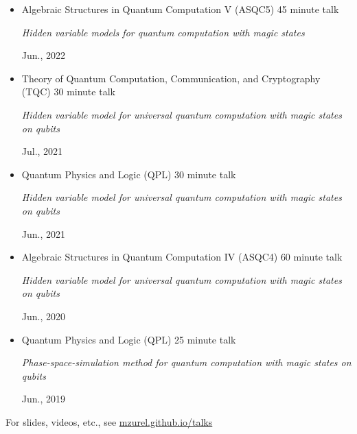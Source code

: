 \documentclass[letterpaper,11pt]{article}
\newcommand{\ConferenceItem}[4]{
	\item{\parbox{0.97\textwidth}{
		{#1} \hfill {#2}\\
		\parbox{0.86\textwidth}{\emph{#3}} \hfill {#4}
	}}
}
\begin{document}
\begin{itemize}[leftmargin=*]
	\ConferenceItem{Algebraic Structures in Quantum Computation V (ASQC5)}{45 minute talk}{Hidden variable models for quantum computation with magic states}{Jun., 2022}
	
	\ConferenceItem{Theory of Quantum Computation, Communication, and Cryptography (TQC)}{30 minute talk}{Hidden variable model for universal quantum computation with magic states on qubits}{Jul., 2021}
	
	\ConferenceItem{Quantum Physics and Logic (QPL)}{30 minute talk}{Hidden variable model for universal quantum computation with magic states on qubits}{Jun., 2021}
	
	\ConferenceItem{Algebraic Structures in Quantum Computation IV (ASQC4)}{60 minute talk}{Hidden variable model for universal quantum computation with magic states on qubits}{Jun., 2020}
	
	\ConferenceItem{Quantum Physics and Logic (QPL)}{25 minute talk}{Phase-space-simulation method for quantum computation with magic states on qubits}{Jun., 2019}
\end{itemize}
For slides, videos, etc., see \href{https://mzurel.github.io/talks}{mzurel.github.io/talks}
\end{document}
